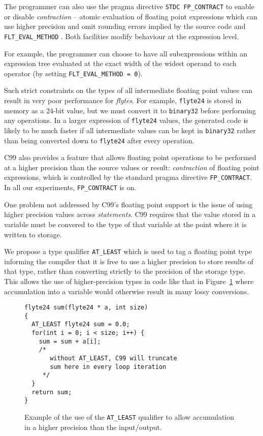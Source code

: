\documentclass{sig-alternate-05-2015}
\newcommand{\mt}[1]{\texttt{#1}}
\begin{document}
The programmer can also use the pragma directive \mt{STDC FP\_CONTRACT} to
enable or disable \emph{contraction} -- atomic evaluation of floating point
expressions which can use higher precision and omit rounding errors implied by
the source code and \mt{FLT\_EVAL\_METHOD} \cite[\S 6.5]{british2003c}. Both
facilities modify behaviour at the expression level.

For example, the programmer can choose to have all subexpressions within an
expression tree evaluated at the exact width of the widest operand to each
operator (by setting \mt{FLT\_EVAL\_METHOD = 0}).

Such strict constraints on the types of all intermediate floating point values
can result in very poor performance for \textit{flytes}. For example,
\mt{flyte24} is stored in memory as a 24-bit value, but we must convert it to
\mt{binary32} before performing any operations. In a larger expression of
\mt{flyte24} values, the generated code is likely to be much faster if all
intermediate values can be kept in \mt{binary32} rather than being converted
down to \mt{flyte24} after every operation.

C99 also provides a feature that allows floating point operations to be
performed at a higher precision than the source values or result:
\emph{contraction} of floating point expressions, which is controlled by the
standard pragma directive \texttt{FP\_CONTRACT}. In all our experiments,
\texttt{FP\_CONTRACT} is on.

One problem not addressed by C99's floating point support is the issue of using
higher precision values across \emph{statements}. C99 requires that the value
stored in a variable must be convered to the type of that variable at the point
where it is written to storage.

We propose a type qualifier \mt{AT\_LEAST}
which is used to tag a floating point type informing the compiler that it is
free to use a higher precision to store results of that type, rather than
converting strictly to the precision of the storage type. This allows the use
of higher-precision types in code like that in Figure~\ref{fig:at-least-demo}
where accumulation into a variable would otherwise result in many lossy
conversions.

\begin{figure}[h]
\begin{verbatim}
flyte24 sum(flyte24 * a, int size)
{
  AT_LEAST flyte24 sum = 0.0;
  for(int i = 0; i < size; i++) {
    sum = sum + a[i];
    /*
       without AT_LEAST, C99 will truncate
       sum here in every loop iteration
     */
  }
  return sum;
}
\end{verbatim}
\caption{Example of the use of the \mt{AT\_LEAST} qualifier to allow accumulation in
a higher precision than the input/output.}
\label{fig:at-least-demo}
\end{figure}
\end{document}

